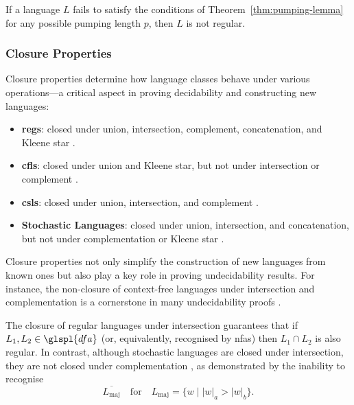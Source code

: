 \begin{corollary}
If a language $L$ fails to satisfy the conditions of Theorem~\ref{thm:pumping-lemma} for any possible pumping length $p$, then $L$ is not regular.
\end{corollary}

\subsubsection{Closure Properties}
Closure properties determine how language classes behave under various operations—a critical aspect in proving decidability and constructing new languages:

\begin{itemize}
    \item \textbf{\glspl{reg}}: closed under union, intersection, complement, concatenation, and Kleene star \cite{sipser2013introduction}.
    \item \textbf{\glspl{cfl}}: closed under union and Kleene star, but not under intersection or complement \cite{chomsky1956three, sipser2013introduction}.
    \item \textbf{\glspl{csl}}: closed under union, intersection, and complement \cite{chomsky1956three, sipser2013introduction}.
    \item \textbf{Stochastic Languages}: closed under union, intersection, and concatenation, but not under complementation or Kleene star \cite{rabin1963probabilistic, droste2009handbook}.
\end{itemize}

\begin{observation}
Closure properties not only simplify the construction of new languages from known ones but also play a key role in proving undecidability results. For instance, the non-closure of context-free languages under intersection and complementation is a cornerstone in many undecidability proofs \cite{sipser2013introduction}.
\end{observation}

\begin{example}
The closure of regular languages under intersection guarantees that if $L_1, L_2 \in \glspl{dfa}$ (or, equivalently, recognised by \glspl{nfa}) then $L_1 \cap L_2$ is also regular. In contrast, although stochastic languages are closed under intersection, they are not closed under complementation \cite{rabin1963probabilistic}, as demonstrated by the inability to recognise 
\[
\overline{L_{\text{maj}}} \quad \text{for} \quad L_{\text{maj}} = \{w \mid |w|_a > |w|_b\}
.\]
\end{example}

